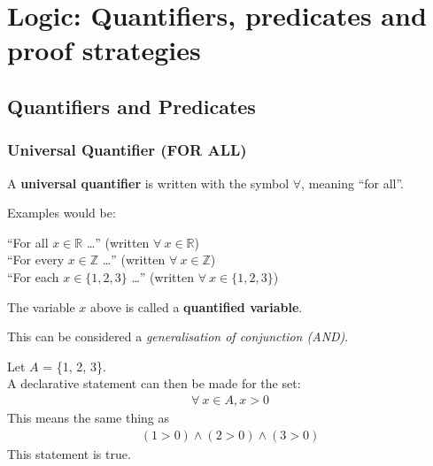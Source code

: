 \documentclass[../notes.tex]{subfiles}
\begin{document}
	\ifSubfilesClassLoaded{\setcounter{chapter}{9}}{}
	\chapter[Logic: Predicates and Proof Strategies]{Logic: Quantifiers, predicates and proof strategies}
		\section{Quantifiers and Predicates}
			\subsection[Universal Quantifier]{Universal Quantifier (FOR ALL)}
				A \textbf{universal quantifier} is written with the symbol $\forall$, meaning ``for all''.
				\begin{example}
					Examples would be:
					\begin{indentparagraph}
						``For all $x \in \mathbb{R}$ \ldots'' (written $\forall \: x \in \mathbb{R}$)\\
						``For every $x \in \mathbb{Z}$ \ldots'' (written $\forall \: x \in \mathbb{Z}$)\\
						``For each $x \in \{1, 2, 3\}$ \ldots'' (written $\forall \: x \in \{1, 2, 3\}$)
					\end{indentparagraph}
					The variable $x$ above is called a \textbf{quantified variable}.
				\end{example}
				This can be considered a \textit{generalisation of conjunction (AND)}.
				\begin{example}
					Let $A$ = \{1, 2, 3\}.\\
					A declarative statement can then be made for the set:
					\begin{align*}
						\forall \: x \in A, x > 0
					\end{align*}
					This means the same thing as 
					\begin{align*}
						(1 > 0) \land (2 > 0) \land (3 > 0)
					\end{align*}
					This statement is true.
				\end{example}
				\pagebreak
\end{document}
